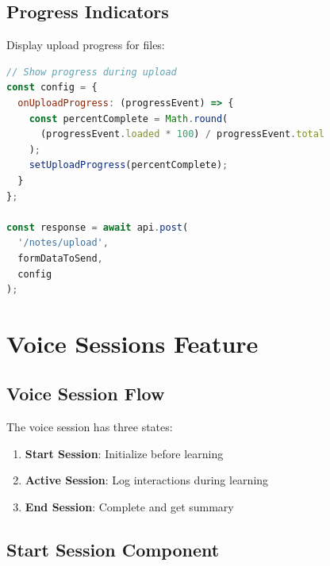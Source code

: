 \documentclass[12pt,a4paper,oneside]{article}
\begin{document}
\subsection{Progress Indicators}

Display upload progress for files:

\begin{lstlisting}[language=javascript]
// Show progress during upload
const config = {
  onUploadProgress: (progressEvent) => {
    const percentComplete = Math.round(
      (progressEvent.loaded * 100) / progressEvent.total
    );
    setUploadProgress(percentComplete);
  }
};

const response = await api.post(
  '/notes/upload',
  formDataToSend,
  config
);
\end{lstlisting}

\section{Voice Sessions Feature}

\subsection{Voice Session Flow}

The voice session has three states:

\begin{enumerate}
    \item \textbf{Start Session}: Initialize before learning
    \item \textbf{Active Session}: Log interactions during learning
    \item \textbf{End Session}: Complete and get summary
\end{enumerate}

\subsection{Start Session Component}
\end{document}
